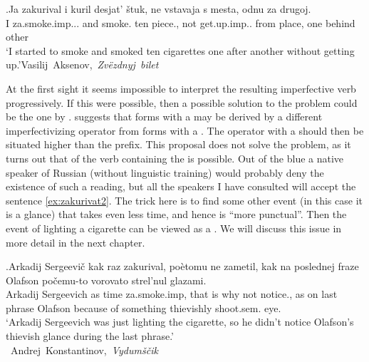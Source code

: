 \exg.\label{ex:zakurivat1}Ja zakurival i kuril desjat' \v{s}tuk, ne vstavaja s mesta, odnu za drugoj.\\
I za.smoke.imp... and smoke. ten piece., not get.up.imp.. from place, one behind other\\
\trans `I started to smoke and smoked ten cigarettes one after another without getting up.'\hbox{}\hfill\hbox{Vasilij Aksenov, \textit{Zv\"{e}zdnyj bilet}}

At the first sight it seems impossible to interpret the resulting imperfective verb progressively. If this were possible, then a possible solution to the problem could be the one by \citet{Ramchand:04}. \citet{Ramchand:04} suggests that  forms with a  may be derived by a different imperfectivizing operator from  forms with a . The operator with a  should then be situated higher than the  prefix. This proposal does not solve the problem, as it turns out that  of the  verb containing the   is possible. Out of the blue a native speaker of Russian (without linguistic training) would probably deny the existence of such a reading, but all the speakers I have consulted will accept the sentence \ref{ex:zakurivat2}. The trick here is to find some other event (in this case it is a glance) that takes even less time, and hence is ``more punctual''. Then the event of lighting a cigarette can be viewed as a . We will discuss this issue in more detail in the next chapter.

\exg.\label{ex:zakurivat2}Arkadij Sergeevi\v{c} kak raz zakurival, po\`{e}tomu ne zametil, kak na poslednej fraze Olafson po\v{c}emu-to vorovato strel'nul glazami.\\
Arkadij Sergeevich as time za.smoke.imp, {that is why} not notice., as on last phrase Olafson {because of something} thievishly shoot.sem. eye.\\
\trans `Arkadij Sergeevich was just lighting the cigarette, so he didn't notice Olafson's thievish glance during the last phrase.'\\\hbox{}\hfill\hbox{
Andrej Konstantinov, \textit{Vydum\v{s}\v{c}ik}}

